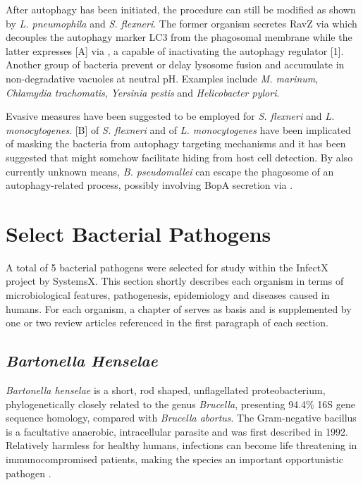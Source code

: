 After autophagy has been initiated, the procedure can still be modified as shown by \textit{L. pneumophila} and \textit{S. flexneri}. The former organism secretes RavZ via  which decouples the autophagy marker LC3 from the phagosomal membrane while the latter expresses [A] via , a capable of inactivating the autophagy regulator [1]. Another group of bacteria prevent or delay lysosome fusion and accumulate in non-degradative vacuoles at neutral pH. Examples include \textit{M. marinum}, \textit{Chlamydia trachomatis}, \textit{Yersinia pestis} and \textit{Helicobacter pylori}.

Evasive measures have been suggested to be employed for \textit{S. flexneri} and \textit{L. monocytogenes}. [B] of \textit{S. flexneri} and  of \textit{L. monocytogenes} have been implicated of masking the bacteria from autophagy targeting mechanisms and it has been suggested that  might somehow facilitate hiding from host cell detection. By also currently unknown means, \textit{B. pseudomallei} can escape the phagosome of an autophagy-related process, possibly involving BopA secretion via .

\section{Select Bacterial Pathogens}

A total of 5 bacterial pathogens were selected for study within the InfectX  project by SystemsX. This section shortly describes each organism in terms of microbiological features, pathogenesis, epidemiology and diseases caused in humans. For each organism, a chapter of \citet{Gillespie2006} serves as basis and is supplemented by one or two review articles referenced in the first paragraph of each section.

\subsection{\textit{Bartonella Henselae}}

\textit{Bartonella henselae} is a short, rod shaped, unflagellated proteobacterium, phylogenetically closely related to the genus \textit{Brucella}, presenting 94.4\% 16S  gene sequence homology, compared with \textit{Brucella abortus}. The Gram-negative bacillus is a facultative anaerobic, intracellular parasite and was first described in 1992. Relatively harmless for healthy humans, infections can become life threatening in immunocompromised patients, making the species an important opportunistic pathogen \citep{Anderson1997,Harms2012}.

